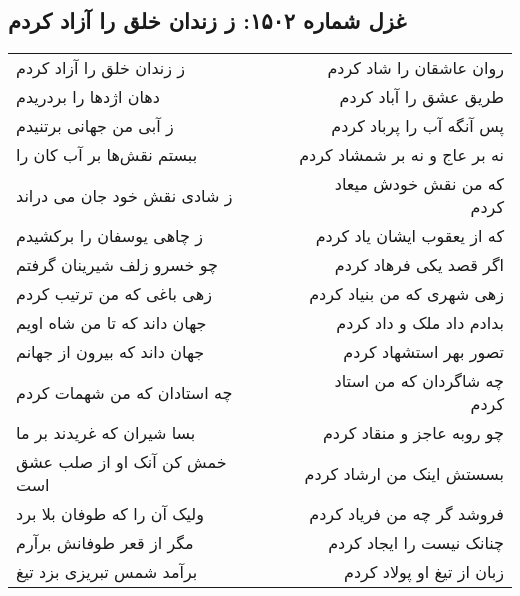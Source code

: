 \begin{center}
\section*{غزل شماره ۱۵۰۲: ز زندان خلق را آزاد کردم}
\label{sec:1502}
\begin{longtable}{l p{0.5cm} r}
ز زندان خلق را آزاد کردم
&&
روان عاشقان را شاد کردم
\\
دهان اژدها را بردریدم
&&
طریق عشق را آباد کردم
\\
ز آبی من جهانی برتنیدم
&&
پس آنگه آب را پرباد کردم
\\
ببستم نقش‌ها بر آب کان را
&&
نه بر عاج و نه بر شمشاد کردم
\\
ز شادی نقش خود جان می دراند
&&
که من نقش خودش میعاد کردم
\\
ز چاهی یوسفان را برکشیدم
&&
که از یعقوب ایشان یاد کردم
\\
چو خسرو زلف شیرینان گرفتم
&&
اگر قصد یکی فرهاد کردم
\\
زهی باغی که من ترتیب کردم
&&
زهی شهری که من بنیاد کردم
\\
جهان داند که تا من شاه اویم
&&
بدادم داد ملک و داد کردم
\\
جهان داند که بیرون از جهانم
&&
تصور بهر استشهاد کردم
\\
چه استادان که من شهمات کردم
&&
چه شاگردان که من استاد کردم
\\
بسا شیران که غریدند بر ما
&&
چو روبه عاجز و منقاد کردم
\\
خمش کن آنک او از صلب عشق است
&&
بسستش اینک من ارشاد کردم
\\
ولیک آن را که طوفان بلا برد
&&
فروشد گر چه من فریاد کردم
\\
مگر از قعر طوفانش برآرم
&&
چنانک نیست را ایجاد کردم
\\
برآمد شمس تبریزی بزد تیغ
&&
زبان از تیغ او پولاد کردم
\\
\end{longtable}
\end{center}
